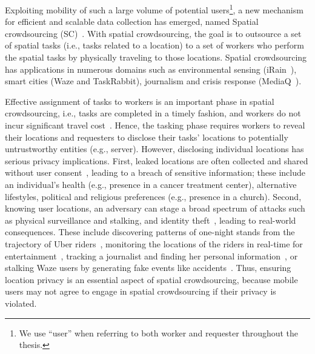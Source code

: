 \documentclass{USC-Thesis}
\numberwithin{equation}{chapter}
\begin{document}
Exploiting mobility of such a large volume of potential users\footnote{We use ``user'' when referring to both worker and requester throughout the thesis.}, a new mechanism for efficient and scalable data collection has emerged, named Spatial crowdsourcing (SC)~\cite{kazemi2012geocrowd}. With spatial crowdsourcing, the goal is to outsource a set of spatial tasks (i.e., tasks related to a location) to a set of workers who perform the spatial tasks by physically traveling to those locations. Spatial crowdsourcing has applications in numerous domains such as environmental sensing (iRain~\cite{iRain}), smart cities (Waze and TaskRabbit), journalism and crisis response (MediaQ~\cite{kim2014mediaq}).

Effective assignment of tasks to workers is an important phase in spatial crowdsourcing, i.e., tasks are completed in a timely fashion, and workers do not incur significant travel cost~\cite{kazemi2012geocrowd,kazemi2013geotrucrowd,deng2013maximizing,to2016real}. 
Hence, the tasking phase requires workers to reveal their locations and requesters to disclose their tasks' locations to potentially untrustworthy entities (e.g., server). However, disclosing individual locations has serious privacy implications. First, leaked locations are often collected and shared without user consent~\cite{Forbes2015,angwin2011,mcmillan2014}, leading to a breach of sensitive information; these include an individual's health (e.g., presence in a cancer treatment center), alternative lifestyles, political and religious preferences (e.g., presence in a church). Second, knowing user locations, an adversary can stage a broad spectrum of attacks such as physical surveillance and stalking, and identity theft~\cite{scheck2010}, leading to real-world consequences. These include discovering patterns of one-night stands from the trajectory of Uber riders~\cite{Perry2014}, monitoring the locations of the riders in real-time for entertainment~\cite{Forbes2014}, tracking a journalist and finding her personal information~\cite{usatoday2014}, or stalking Waze users by generating fake events like accidents~\cite{Wang2016}.
Thus, ensuring location privacy is an essential aspect of spatial crowdsourcing, because mobile users
may not agree to engage in spatial crowdsourcing if their privacy is violated.
\end{document}
